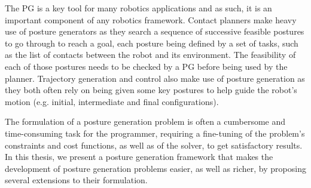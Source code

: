 The PG is a key tool for many robotics applications and as such, it is an important component of any robotics framework.
Contact planners make heavy use of posture generators as they search a sequence of successive feasible postures to go through to reach a goal, each posture being defined by a set of tasks, such as the list of contacts between the robot and its environment.
The feasibility of each of those postures needs to be checked by a PG before being used by the planner.
Trajectory generation and control also make use of posture generation as they both often rely on being given some key postures to help guide the robot's motion (e.g. initial, intermediate and final configurations).


The formulation of a posture generation problem is often a cumbersome and time-consuming task for the programmer, requiring a fine-tuning of the problem's constraints and cost functions, as well as of the solver, to get satisfactory results.
In this thesis, we present a posture generation framework that makes the development of posture generation problems easier, as well as richer, by proposing several extensions to their formulation.




